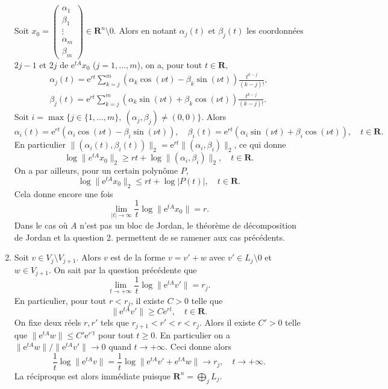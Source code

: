 \documentclass[a4paper,12pt,openany]{article}
\theoremstyle{plain}
\theoremstyle{definition}
\newcommand{\e}{\mathrm{e}}
\newcommand{\R}{\mathbf{R}}
\begin{document}
\begin{enumerate}[resume]
\begin{equation}
\end{equation}
Soit $x_0 = \begin{pmatrix} \alpha_1 \\ \beta_1 \\ \vdots \\ \alpha_m \\ \beta_m \end{pmatrix}  \in \R^n \setminus 0$. Alors en notant $\alpha_j(t)$ et $\beta_j(t)$ les coordonn\'ees $2j-1$ et $2j$ de $\e^{tA}x_0$ ($j = 1, \dots, m$), on a, pour tout $t \in \R$,
$$
\begin{aligned}
\alpha_j(t) = \e^{rt}\sum_{k=j}^m (\alpha_k \cos(\nu t) - \beta_k \sin(\nu t)) \frac{t^{k-j}}{(k-j)!}, \\
\beta_j(t) = \e^{rt}\sum_{k=j}^m (\alpha_k \sin(\nu t) + \beta_k \cos(\nu t)) \frac{t^{k-j}}{(k-j)!}.
\end{aligned}
$$
Soit $i = \max\{j \in \{1, \dots, m\},~(\alpha_j, \beta_j) \neq (0, 0)\}.$ Alors
$$
\alpha_i(t) = \e^{rt}(\alpha_i \cos(\nu t) - \beta_i \sin(\nu t)), \quad \beta_i(t) = \e^{rt}(\alpha_i \sin(\nu t) + \beta_i \cos(\nu t)), \quad t \in \R.
$$
En particulier $\|(\alpha_i(t), \beta_i(t))\|_2= \e^{rt} \|(\alpha_i, \beta_i)\|_2$, ce qui donne 
$$
\log\|e^{tA}x_0\|_2 \geq rt + \log \|(\alpha_i, \beta_i)\|_2, \quad t \in \R.
$$
On a par ailleurs, pour un certain polyn\^ome $P$,
$$
\log\|\e^{tA}x_0\|_2 \leq rt + \log |P(t)|, \quad t \in \R.
$$
Cela donne encore une fois 
$$
\lim_{|t|\to \infty} \frac{1}{t} \log \|\e^{tA}x_0\| = r.
$$
Dans le cas o\`u $A$ n'est pas un bloc de Jordan, le th\'eor\`eme de d\'ecomposition de Jordan et la question 2. permettent de se ramener aux cas pr\'ec\'edents.

\item Soit $v \in V_j \setminus V_{j+1}$. Alors $v$ est de la forme $v = v' + w$ avec $v' \in L_j \setminus 0$ et $w \in V_{j+1}.$ On sait par la question pr\'ec\'edente que
$$
\lim_{t\to+\infty} \frac{1}{t} \log \|\e^{tA}v'\| = r_j.
$$
En particulier, pour tout $r < r_j$, il existe $C>0$ telle que
$$
\|\e^{tA}v'\|\geq C\e^{rt}, \quad t \in \R.
$$
On fixe deux r\'eels $r,r'$ tels que $r_{j+1} < r' < r < r_j$. Alors il existe $C'>0$ telle que $\|\e^{tA}w\|\leq C' \e^{r't}$ pour tout $t\geq 0$. En particulier on a $\|\e^{tA}w\|/\|\e^{tA}v'\|\to 0$ quand $t \to + \infty$. Ceci donne alors
$$
\frac{1}{t}\log\|\e^{tA}v\| = \frac{1}{t} \log \|\e^{tA}v' + \e^{tA}w\|\to r_j, \quad t \to +\infty.
$$
La r\'eciproque est alors imm\'ediate puisque $\R^n = \bigoplus_j L_j.$ 


\end{enumerate}
\end{document}
